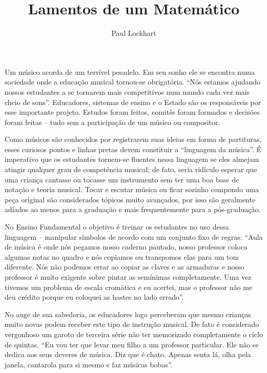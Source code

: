 \documentclass[a4paper,oneside,10pt,notitlepage]{article}
\title{Lamentos de um Matemático}
\author{Paul Lockhart}
\date{}
\begin{document}
\maketitle

Um músico acorda de um terrível pesadelo.
Em seu sonho ele se encontra numa sociedade onde a educação musical tornou-se obrigatória.
``Nós estamos ajudando nossos estudantes a se tornarem mais competitivos num mundo cada vez mais cheio de sons''.
Educadores, sistemas de ensino e o Estado são os responsáveis por esse importante projeto.
Estudos foram feitos, comitês foram formados e decisões foram feitas -- tudo sem a participação de um músico ou compositor.

Como músicos são conhecidos por registrarem suas ideias em forma de partituras, esses curiosos pontos e linhas pretas devem constituir a ``linguagem da música''.
É imperativo que os estudantes tornem-se fluentes nessa linguagem se eles almejam atingir qualquer grau de competência musical;
de fato, seria ridículo esperar que uma criança cantasse ou tocasse um instrumento sem ter uma boa base de notação e teoria musical.
Tocar e escutar música ou ficar sozinho compondo uma peça original são considerados tópicos muito avançados, por isso são geralmente adiados ao menos para a graduação e mais frequentemente para a pós-graduação.

No Ensino Fundamental o objetivo é treinar os estudantes no uso dessa linguagem -- manipular símbolos de acordo com um conjunto fixo de regras:
``Aula de música é onde nós pegamos nosso caderno pautado, nosso professor coloca algumas notas no quadro e nós copiamos ou transpomos elas para um tom diferente.
Nós não podemos errar ao copiar as claves e as armaduras e nosso professor é muito exigente sobre pintar as semínimas completamente.
Uma vez tivemos um problema de escala cromática e eu acertei, mas o professor não me deu crédito porque eu coloquei as hastes no lado errado''.

No auge de sua sabedoria, os educadores logo perceberam que mesmo crianças muito novas podem receber este tipo de instrução musical.
De fato é considerado vergonhoso um garoto de terceira série não ter memorizado completamente o ciclo de quintas.
``Eu vou ter que levar meu filho a um professor particular.
Ele não se dedica aos seus deveres de música.
Diz que é chato.
Apenas senta lá, olha pela janela, cantarola para si mesmo e faz músicas bobas''.
\end{document}
